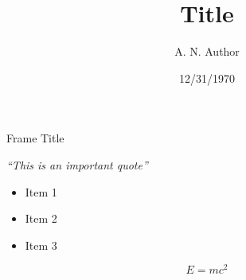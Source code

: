 \documentclass[hyperref=hidelinks, aspectratio=169]{beamer}
\title{Title}
\author{A. N. Author}
\institute{Example University}
\date{12/31/1970}
\begin{document}
\begin{frame}
    \titlepage
\end{frame} %

\begin{frame}{Frame Title}
  \begin{center}
    \emph{``This is an important quote''}\\
  \end{center}
  \begin{itemize}
  \item Item 1
  \item Item 2
  \item Item 3
  \end{itemize}
  $$E = mc^2$$
  
\end{frame}
\end{document}
